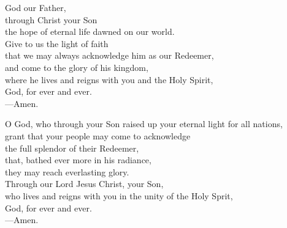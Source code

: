 \prayer

\begin{prayerverse}

God our Father,\\
through Christ your Son\\
the hope of eternal life dawned on our world.\\
Give to us the light of faith\\
that we may always acknowledge him as our Redeemer,\\
and come to the glory of his kingdom,\\
where he lives and reigns with you and the Holy Spirit,\\
God, for ever and ever.\\
{\color{red}---\thinspace}Amen.

\end{prayerverse}


\begin{prayerverse}

O God, who through your Son raised up your eternal light for all nations,\\
grant that your people may come to acknowledge\\
the full splendor of their Redeemer,\\
that, bathed ever more in his radiance,\\
they may reach everlasting glory.\\
Through our Lord Jesus Christ, your Son,\\
who lives and reigns with you in the unity of the Holy Sprit,\\
God, for ever and ever.\\
{\color{red}---\thinspace}Amen.

\end{prayerverse}